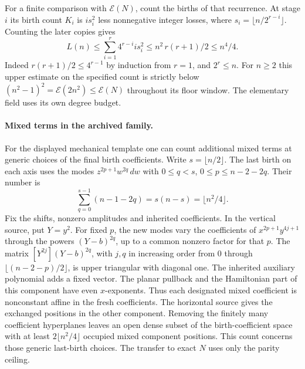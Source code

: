 For a finite comparison with \(\mathcal E(N)\), count the births of that recurrence. At stage \(i\) its birth count \(K_i\) is \(i s_i^2\) less nonnegative integer losses, where \(s_i=\lfloor n/2^{r-i}\rfloor\). Counting the later copies gives
\[
 L(n)\le \sum_{i=1}^r4^{r-i}i s_i^2
 \le n^2\,r(r+1)/2\le n^4/4 .
\]
Indeed \(r(r+1)/2\le4^{r-1}\) by induction from \(r=1\), and \(2^r\le n\).
For \(n\ge2\) this upper estimate on the specified count is strictly below \((n^2-1)^2=\mathcal E(2n^2)\le\mathcal E(N)\) throughout its floor window. The elementary field uses its own degree budget.

\paragraph{Mixed terms in the archived family.}
For the displayed mechanical template one can count additional mixed terms at generic choices of the final birth coefficients. Write \(s=\lfloor n/2\rfloor\). The last birth on each axis uses the modes \(z^{2p+1}w^{2q}\,dw\) with \(0\le q<s\), \(0\le p\le n-2-2q\). Their number is
\[
 \sum_{q=0}^{s-1}(n-1-2q)=s(n-s)=\lfloor n^2/4\rfloor .
\]
Fix the shifts, nonzero amplitudes and inherited coefficients. In the vertical source, put \(Y=y^2\). For fixed \(p\), the new modes vary the coefficients of \(x^{2p+1}y^{4j+1}\) through the powers \((Y-b)^{2q}\), up to a common nonzero factor for that \(p\). The matrix \([Y^{2j}](Y-b)^{2q}\), with \(j,q\) in increasing order from \(0\) through \(\lfloor(n-2-p)/2\rfloor\), is upper triangular with diagonal one. The inherited auxiliary polynomial adds a fixed vector. The planar pullback and the Hamiltonian part of this component have even \(x\)-exponents. Thus each designated mixed coefficient is nonconstant affine in the fresh coefficients. The horizontal source gives the exchanged positions in the other component. Removing the finitely many coefficient hyperplanes leaves an open dense subset of the birth-coefficient space with at least \(2\lfloor n^2/4\rfloor\) occupied mixed component positions. This count concerns those generic last-birth choices. The transfer to exact \(N\) uses only the parity ceiling.

